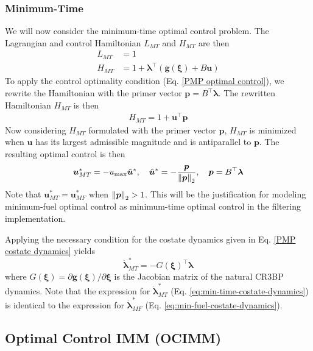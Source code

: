 \documentclass[letterpaper, preprint, paper,11pt]{AAS}	%
\begin{document}
\subsubsection{Minimum-Time}

We will now consider the minimum-time optimal control problem. The Lagrangian and control Hamiltonian $L_{MT}$ and $H_{MT}$ are then
\begin{align}
    L_{MT} &= 1 \\
    H_{MT} &= 1 + \bm{\lambda}^\top (\bm{g}(\bm{\xi}) + B\bm{u})
\end{align}
To apply the control optimality condition (Eq. \ref{PMP optimal control}), we rewrite the Hamiltonian with the primer vector $\bm{p} = B^\top \bm{\lambda}$. The rewritten Hamiltonian $H_{MT}$ is then
\begin{align}
    H_{MT} = 1 + \bm{u}^\top \bm{p}
\end{align}
Now considering $H_{MT}$ formulated with the primer vector $\bm{p}$, $H_{MT}$ is minimized when $\bm{u}$ has its largest admissible magnitude and is antiparallel to $\bm{p}$. The resulting optimal control is then
\begin{align}
    \bm{u}_{MT}^* = - u_\text{max}\hat{\bm{u}}^*, \quad \hat{\bm{u}}^* = -\frac{\bm{p}}{\norm{\bm{p}}_2}, \quad \bm{p} = B^\top \bm{\lambda} \label{eq:min-time-control}
\end{align}
Note that $\bm{u}_{MT}^* = \bm{u}_{MF}^*$ when $\norm{\bm{p}}_2 > 1$. This will be the justification for modeling minimum-fuel optimal control as minimum-time optimal control in the filtering implementation.

Applying the necessary condition for the costate dynamics given in Eq. \ref{PMP costate dynamics} yields
\begin{equation}
    \dot{\bm{\lambda}}_{MT}^* = -G(\bm{\xi})^\top \bm{\lambda} \label{eq:min-time-costate-dynamics}
\end{equation}
\noindent where $G(\bm{\xi}) = \partial \bm{g}(\bm{\xi})/\partial \bm{\xi}$ is the Jacobian matrix of the natural CR3BP dynamics. Note that the expression for $\dot{\bm{\lambda}}_{MT}^*$ (Eq. \ref{eq:min-time-costate-dynamics}) is identical to the expression for $\dot{\bm{\lambda}}_{MF}^*$ (Eq. \ref{eq:min-fuel-costate-dynamics}).


\subsection{Optimal Control IMM (OCIMM)}
\end{document}

